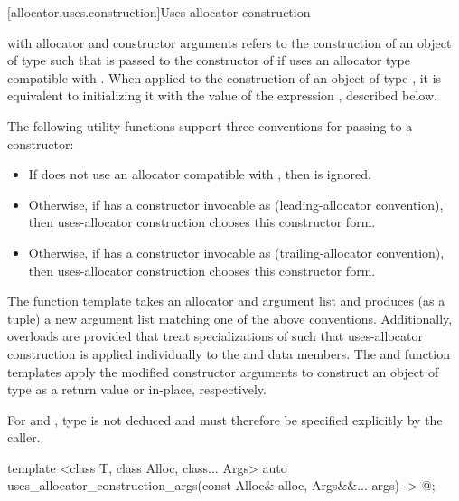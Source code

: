 [allocator.uses.construction]{Uses-allocator construction}

\pnum
{}
with allocator  and constructor arguments 
refers to the construction of an object of type 
such that  is passed to the constructor of 
if  uses an allocator type compatible with .
When applied to the construction of an object of type ,
it is equivalent to initializing it with the value of the expression
, described below.

\pnum
The following utility functions support
three conventions for passing  to a constructor:
\begin{itemize}
\item
  If  does not use an allocator compatible with ,
  then  is ignored.
\item
  Otherwise, if  has a constructor invocable as
   (leading-allocator convention),
  then uses-allocator construction chooses this constructor form.
\item
  Otherwise, if  has a constructor invocable as
   (trailing-allocator convention),
  then uses-allocator construction chooses this constructor form.
\end{itemize}

\pnum
The  function template
takes an allocator and argument list and
produces (as a tuple) a new argument list matching one of the above conventions.
Additionally, overloads are provided
that treat specializations of 
such that uses-allocator construction is applied individually
to the  and  data members.
The  and
 function templates
apply the modified constructor arguments
to construct an object of type 
as a return value or in-place, respectively.
\begin{note}
For  and
, type 
is not deduced and must therefore be specified explicitly by the caller.
\end{note}

%
\begin{itemdecl}
template <class T, class Alloc, class... Args>
  auto uses_allocator_construction_args(const Alloc& alloc, Args&&... args) -> @\seebelow@;
\end{itemdecl}

